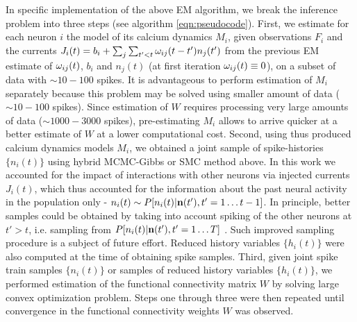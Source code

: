 In specific implementation of the above EM algorithm, we break the inference problem into three steps (see algorithm \ref{eqn:pseudocode}).  First, we estimate for each neuron $i$ the model of its calcium dynamics $M_i$, given observations $F_i$ and the currents $J_i(t)=b_i+\sum_{j}\sum_{t'<t}\omega_{ij}(t-t')n_{j}(t')$ from the previous EM estimate of $\omega_{ij}(t)$, $b_i$ and $n_{j}(t)$ (at first iteration $\omega_{ij}(t) \equiv 0$), on a subset of data with $\sim 10-100$ spikes.  It is advantageous to perform estimation of $M_i$ separately because this problem may be solved using smaller amount of data ($\sim 10-100$ spikes). Since estimation of $W$ requires processing very large amounts of data ($\sim 1000-3000$ spikes), pre-estimating $M_i$ allows to arrive quicker at a better estimate of $W$ at a lower computational cost.  Second, using thus produced calcium dynamics models $M_i$, we obtained a joint sample of spike-histories $\{ n_i(t)\}$ using hybrid MCMC-Gibbs or SMC method above.  In this work we accounted for the impact of interactions with other neurons via injected currents $J_i(t)$, which thus accounted for the information about the past neural activity in the population only - $n_i(t) \sim P[n_i(t)|{\bf n}(t'), {t'=1\ldots t-1}]$. In principle, better samples could be obtained by taking into account spiking of the other neurons at $t'>t$, i.e. sampling from $P[n_i(t)|{\bf n}(t'), {t'=1\ldots T}]$ \cite{PL07}. Such improved sampling procedure is a subject of future effort.  Reduced history variables $\{h_i(t)\}$ were also computed at the time of obtaining spike samples.  Third, given joint spike train samples $\{ n_i(t)\}$ or samples of reduced history variables $\{ h_i(t)\}$, we performed estimation of the functional connectivity matrix $W$ by solving large convex optimization problem.  Steps one through three were then repeated until convergence in the functional connectivity weights $W$ was observed.

